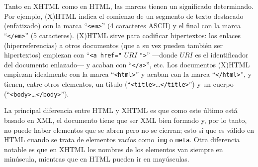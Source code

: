 Tanto en XHTML como en HTML, las marcas tienen un significado determinado. 
Por ejemplo, (X)HTML indica el comienzo de un segmento de texto destacado (enfatizado) con la marca ``\texttt{<em>}'' (4 caracteres ASCII) y el final con la marca ``\texttt{</em>}'' (5 caracteres). (X)HTML sirve para codificar hipertextos: los enlaces (hiperreferencias) a otros documentos (que a su vez pueden también ser hipertextos) empiezan con ``\texttt{<a href="} $\mathit{URI}$ \texttt{"}\texttt{>}'' ---donde $\mathit{URI}$ es el identificador del documento enlazado--- y acaban con ``\texttt{</a>}'', etc. Los documentos (X)HTML empiezan idealmente con la marca ``\texttt{<html>}'' y acaban con la marca ``\texttt{</html>}'', y tienen, entre otros elementos, un título (``\texttt{<title>}\ldots\texttt{</title>}'') y un cuerpo (``\texttt{<body>}\ldots\texttt{</body>}''). 

La principal diferencia entre HTML y XHTML es que como este último está basado en XML, el documento tiene que ser XML bien formado y, por lo tanto, no puede haber elementos que se abren pero no se cierran; esto sí que es válido en HTML cuando se trata de elementos vacíos como \texttt{img} o \texttt{meta}. Otra diferencia notable es que en XHTML los nombres de los elementos van siempre en minúscula, mientras que en HTML pueden ir en mayúsculas. 

